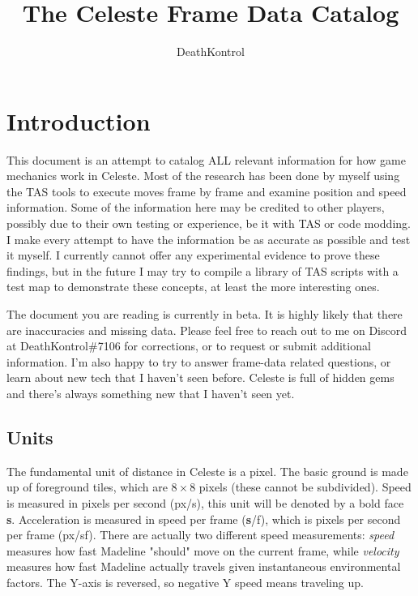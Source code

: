 \documentclass[oneside]{book}
\title{The Celeste Frame Data Catalog}
\author{DeathKontrol}
\date{}
\newcommand{\s}{\textbf{s}}
\begin{document}
\maketitle

\tableofcontents

\chapter{Introduction}

This document is an attempt to catalog ALL relevant information for how game mechanics work in Celeste. Most of the research has been done by myself using the TAS tools to execute moves frame by frame and examine position and speed information. Some of the information here may be credited to other players, possibly due to their own testing or experience, be it with TAS or code modding. I make every attempt to have the information be as accurate as possible and test it myself. I currently cannot offer any experimental evidence to prove these findings, but in the future I may try to compile a library of TAS scripts with a test map to demonstrate these concepts, at least the more interesting ones.

The document you are reading is currently in beta. It is highly likely that there are inaccuracies and missing data. Please feel free to reach out to me on Discord at DeathKontrol\#7106 for corrections, or to request or submit additional information. I'm also happy to try to answer frame-data related questions, or learn about new tech that I haven't seen before. Celeste is full of hidden gems and there's always something new that I haven't seen yet.

\section{Units}

The fundamental unit of distance in Celeste is a pixel. The basic ground is made up of foreground tiles, which are $8\times8$ pixels (these cannot be subdivided). Speed is measured in pixels per second (px/s), this unit will be denoted by a bold face \s. Acceleration is measured in speed per frame (\s/f), which is pixels per second per frame (px/sf). There are actually two different speed measurements: \textit{speed} measures how fast Madeline "should" move on the current frame, while \textit{velocity} measures how fast Madeline actually travels given instantaneous environmental factors. The Y-axis is reversed, so negative Y speed means traveling up.
\end{document}
